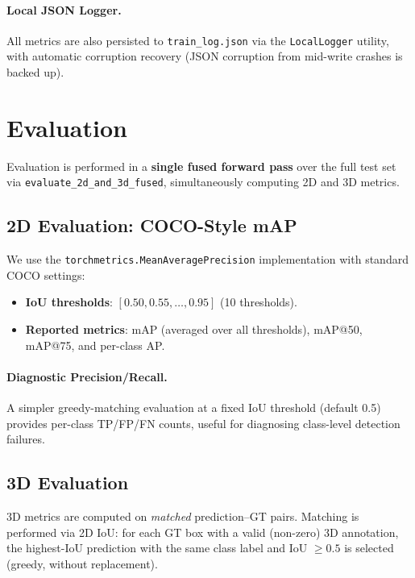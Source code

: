 \documentclass[runningheads]{llncs}
\begin{document}
\paragraph{Local JSON Logger.}  All metrics are also persisted to \texttt{train\_log.json} via the \texttt{LocalLogger} utility, with automatic corruption recovery (JSON corruption from mid-write crashes is backed up).


\section{Evaluation}
\label{sec:evaluation}

Evaluation is performed in a \textbf{single fused forward pass} over the full test set via \texttt{evaluate\_2d\_and\_3d\_fused}, simultaneously computing 2D and 3D metrics.

\subsection{2D Evaluation: COCO-Style mAP}
\label{sec:eval_2d}

We use the \texttt{torchmetrics.MeanAveragePrecision} implementation with standard COCO settings:
\begin{itemize}
    \item \textbf{IoU thresholds}: $[0.50, 0.55, \ldots, 0.95]$ (10 thresholds).
    \item \textbf{Reported metrics}: mAP (averaged over all thresholds), mAP@50, mAP@75, and per-class AP.
\end{itemize}

\paragraph{Diagnostic Precision/Recall.}  A simpler greedy-matching evaluation at a fixed IoU threshold (default 0.5) provides per-class TP/FP/FN counts, useful for diagnosing class-level detection failures.

\subsection{3D Evaluation}
\label{sec:eval_3d}

3D metrics are computed on \emph{matched} prediction--GT pairs.  Matching is performed via 2D IoU: for each GT box with a valid (non-zero) 3D annotation, the highest-IoU prediction with the same class label and IoU $\geq 0.5$ is selected (greedy, without replacement).
\end{document}
